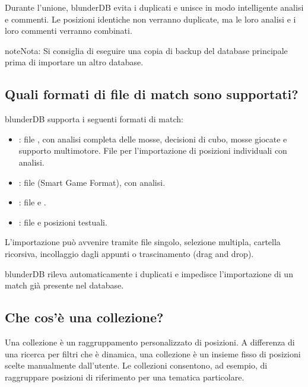 \documentclass[letterpaper,10pt,italian]{sphinxmanual}
\begin{document}
\sphinxAtStartPar
Durante l’unione, blunderDB evita i duplicati e unisce in modo intelligente analisi e commenti. Le posizioni identiche non verranno duplicate, ma le loro analisi e i loro commenti verranno combinati.

\begin{sphinxadmonition}{note}{Nota:}
\sphinxAtStartPar
Si consiglia di eseguire una copia di backup del database principale prima di importare un altro database.
\end{sphinxadmonition}


\subsection{Quali formati di file di match sono supportati?}
\label{\detokenize{faq:quels-formats-de-fichiers-de-match-sont-supportes}}
\sphinxAtStartPar
blunderDB supporta i seguenti formati di match:
\begin{itemize}
\item {} 
\sphinxAtStartPar
{}: file , con analisi completa delle mosse, decisioni di cubo, mosse giocate e supporto multi\sphinxhyphen{}motore. File  per l’importazione di posizioni individuali con analisi.

\item {} 
\sphinxAtStartPar
{}: file  (Smart Game Format), con analisi.

\item {} 
\sphinxAtStartPar
{}: file  e .

\item {} 
\sphinxAtStartPar
{}: file  e posizioni testuali.

\end{itemize}

\sphinxAtStartPar
L’importazione può avvenire tramite file singolo, selezione multipla, cartella ricorsiva, incollaggio dagli appunti o trascinamento (drag and drop).

\sphinxAtStartPar
blunderDB rileva automaticamente i duplicati e impedisce l’importazione di un match già presente nel database.


\subsection{Che cos’è una collezione?}
\label{\detokenize{faq:qu-est-ce-qu-une-collection}}
\sphinxAtStartPar
Una collezione è un raggruppamento personalizzato di posizioni. A differenza di una ricerca per filtri che è dinamica, una collezione è un insieme fisso di posizioni scelte manualmente dall’utente. Le collezioni consentono, ad esempio, di raggruppare posizioni di riferimento per una tematica particolare.
\end{document}
